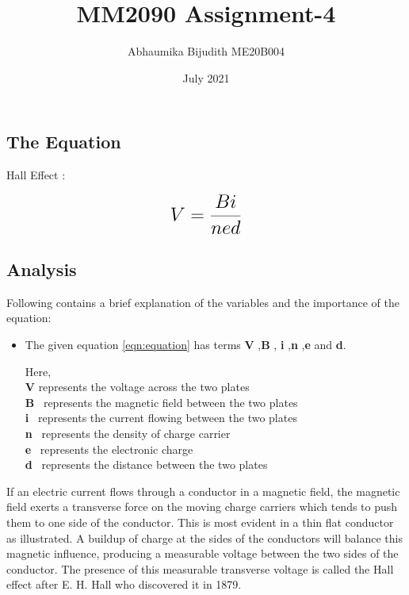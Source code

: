 \documentclass[a4paper, 12pt]{article}
\begin{document}
\title{MM2090 Assignment-4}
\author{Abhaumika Bijudith ME20B004}
\date{July 2021}
\maketitle

\subsection{The Equation}

Hall Effect  :  

\begin{equation}
 {\LARGE{\textbf{$V =\frac{Bi}{{ned}}$}}}
 \label{eqn:equation}
\end{equation}


\subsection{Analysis}
Following contains a brief explanation of the variables and the importance of the equation:
\begin{itemize}
\item {\normalsize {The given equation \ref{eqn:equation} has terms \textbf{V} ,\textbf{B} , \textbf{i} ,\textbf{n} ,\textbf{e} and  \textbf{d}.}}

{ Here,}\\
{\textbf{V} represents the voltage across the two plates }\\
{\textbf{B} \  represents the magnetic field between the two plates}\\
{\textbf{i} \  represents the current flowing between the two plates}\\
{\textbf{n} \  represents the density of charge carrier}\\
{\textbf{e} \ represents the electronic charge}\\
{\textbf{d} \ represents the distance between the two plates}
\end{itemize}

If an electric current flows through a conductor in a magnetic field, the magnetic field exerts a transverse force on the moving charge carriers which tends to push them to one side of the conductor. This is most evident in a thin flat conductor as illustrated. A buildup of charge at the sides of the conductors will balance this magnetic influence, producing a measurable voltage between the two sides of the conductor. The presence of this measurable transverse voltage is called the Hall effect after E. H. Hall who discovered it in 1879. \cite{weblink1}
\end{document}

